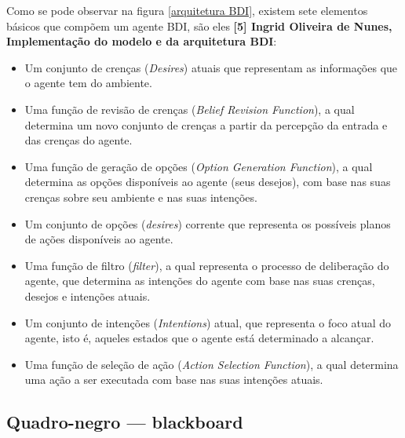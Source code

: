 Como se pode observar na figura \ref{arquitetura BDI}, existem sete elementos básicos que compõem um agente BDI, são eles \textbf{[5] Ingrid Oliveira de Nunes, Implementação do modelo e da arquitetura BDI}:
\begin{itemize}
\item Um conjunto de crenças (\textit{Desires}) atuais que representam as informações que o agente tem do ambiente.
\item Uma função de revisão de crenças (\textit{Belief Revision Function}), a qual determina um novo conjunto de crenças a partir da percepção da entrada e das crenças do agente.
\item Uma função de geração de opções (\textit{Option Generation Function}), a qual determina as opções disponíveis ao agente (seus desejos), com base nas suas crenças sobre seu ambiente e nas suas intenções.
\item Um conjunto de opções (\textit{desires}) corrente que representa os possíveis planos de ações disponíveis ao agente.
\item Uma função de filtro (\textit{filter}), a qual representa o processo de deliberação do agente, que determina as intenções do agente com base nas suas crenças, desejos e intenções atuais.
\item Um conjunto de intenções (\textit{Intentions}) atual, que representa o foco atual do agente, isto é, aqueles estados que o agente está determinado a alcançar.
\item Uma função de seleção de ação (\textit{Action Selection Function}), a qual determina uma ação a ser executada com base nas suas intenções atuais. 
\end{itemize}

\subsection{Quadro-negro --- blackboard}

